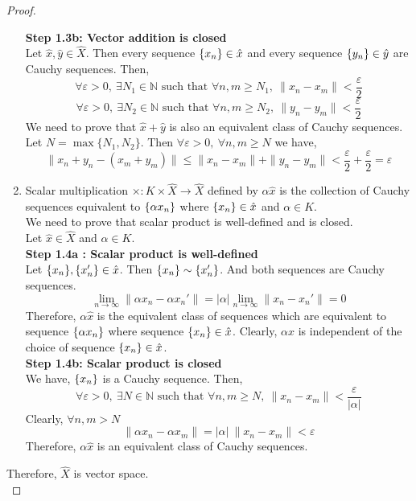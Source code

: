 \begin{proof}
\begin{enumerate}
			\textbf{Step 1.3b: Vector addition is closed}\\
			Let $\hat{x},\hat{y} \in \hat{X}$.
			Then every sequence $\{x_n\} \in \hat{x}$ and every sequence $\{y_n\} \in \hat{y}$ are Cauchy sequences.
			Then,
			$$ \forall \varepsilon > 0,\ \exists N_1 \in \mathbb{N} \text{ such that } \forall n,m \ge N_1,\ \| x_n - x_m \| < \frac{\varepsilon}{2} $$
			$$ \forall \varepsilon > 0,\ \exists N_2 \in \mathbb{N} \text{ such that } \forall n,m \ge N_2,\ \| y_n - y_m \| < \frac{\varepsilon}{2} $$
			We need to prove that $\hat{x}+\hat{y}$ is also an equivalent class of Cauchy sequences.
			Let $N = \max\{ N_1,N_2 \}$.
			Then $\forall \varepsilon > 0,\ \forall n,m \ge N$ we have,
			$$ \| x_n+y_n - (x_m+y_m) \| \le \| x_n - x_m \| + \| y_n - y_m \| < \frac{\varepsilon}{2} + \frac{\varepsilon}{2} = \varepsilon $$
		\item Scalar multiplication $\times : K \times \hat{X} \to \hat{X}$ defined by $\alpha \hat{x}$ is the collection of Cauchy sequences equivalent to $\{\alpha x_n\}$ where $\{x_n\} \in \hat{x}$ and $\alpha \in K$.\\

			We need to prove that scalar product is well-defined and is closed.\\
			Let $\hat{x} \in \hat{X}$ and $\alpha \in K$.\\

			\textbf{Step 1.4a : Scalar product is well-defined}\\
			Let $\{x_n\},\{x_n'\} \in \hat{x}$.
			Then $\{x_n\} \sim \{x_n'\}$.
			And both sequences are Cauchy sequences.
			$$ \lim_{n \to \infty} \| \alpha x_n - \alpha x_n' \| = |\alpha| \lim_{n \to \infty} \| x_n - x_n' \| = 0 $$
			Therefore, $\alpha\hat{x}$ is the equivalent class of sequences which are equivalent to sequence $\{\alpha x_n\}$ where sequence $\{x_n\} \in \hat{x}$.
			Clearly, $\alpha\hat{x}$ is independent of the choice of sequence $\{x_n\} \in \hat{x}$.\\

			\textbf{Step 1.4b: Scalar product is closed}\\
			We have, $\{x_n\}$ is a Cauchy sequence.
			Then, 
			$$\forall \varepsilon > 0,\ \exists N \in \mathbb{N} \text{ such that } \forall n,m \ge N,\ \| x_n - x_m \| < \frac{\varepsilon}{|\alpha|} $$
			Clearly, $\forall n,m > N$
			$$ \| \alpha x_n - \alpha x_m \| = |\alpha|\ \| x_n - x_m \| < \varepsilon $$
			Therefore, $\alpha\hat{x}$ is an equivalent class of Cauchy sequences.
	\end{enumerate}
	Therefore, $\hat{X}$ is vector space.\\


\end{proof}
